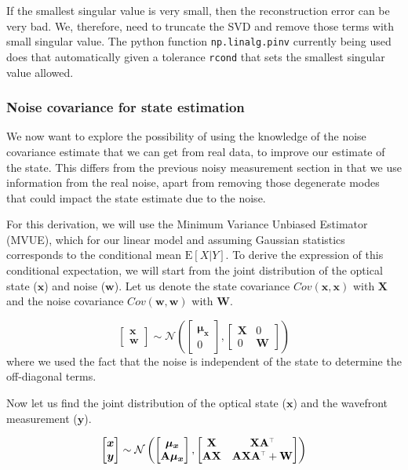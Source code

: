 \documentclass[SE,authoryear,toc]{lsstdoc}
\renewcommand{\v}[1]{\mathbf{#1}}
\newcommand{\tr}{\scalebox{0.6}{$\top$}}
\begin{document}
If the smallest singular value is very small, then the reconstruction error can be very bad. We, therefore, need to truncate the SVD and remove those terms with small singular value. The python function \texttt{np.linalg.pinv} currently being used does that automatically given a tolerance \texttt{rcond} that sets the smallest singular value allowed.
\subsubsection*{Noise covariance for state estimation}
We now want to explore the possibility of using the knowledge of the noise covariance estimate that we can get from real data, to improve our estimate of the state. This differs from the previous noisy measurement section in that we use information from the real noise, apart from removing those degenerate modes that could impact the state estimate due to the noise. 

For this derivation, we will use the Minimum Variance Unbiased Estimator (MVUE), which for our linear model and assuming Gaussian statistics corresponds to the conditional mean $\mathrm{E}[X | Y]$. To derive the expression of this conditional expectation, we will start from the joint distribution of the optical state ($\bm{x}$) and noise ($\bm{w}$). Let us denote the state covariance $Cov(\bm{x}, \bm{x})$ with  $\v{X}$ and the noise covariance $Cov(\bm{w}, \bm{w})$ with $\v{W}$.  

\begin{equation}
    \begin{bmatrix}
        \bm{x} \\
        \bm{w}
    \end{bmatrix}
    \sim \mathcal{N} \left(
    \begin{bmatrix}
        \bm{\mu_x} \\
        0
    \end{bmatrix},
    \begin{bmatrix}
        \v{X} & 0 \\
        0 & \v{W}
    \end{bmatrix}
    \right) 
\end{equation}
where we used the fact that the noise is independent of the state to determine the off-diagonal terms.

Now let us find the joint distribution of the optical state ($\bm{x}$) and the wavefront measurement ($\bm{y}$). 

\begin{equation}
    \begin{bmatrix}
        \bm{x} \\
        \bm{y}
    \end{bmatrix}
    \sim \mathcal{N} \left(
    \begin{bmatrix}
        \bm{\mu_x} \\
        \v{A}\bm{\mu_x}
    \end{bmatrix},
    \begin{bmatrix}
        \v{X} & \v{X}\v{A}^{\tr} \\
        \v{A}\v{X} & \v{A}\v{X}\v{A}^{\tr} + \v{W}
    \end{bmatrix}
    \right) 
\end{equation}
\end{document}
